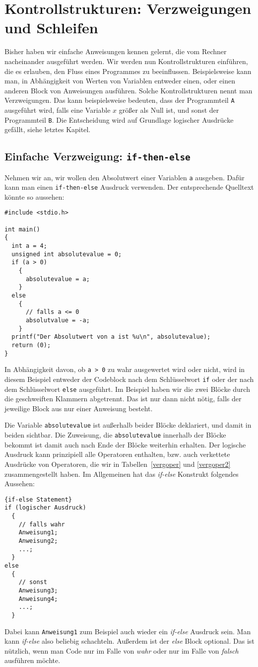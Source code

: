 \section{Kontrollstrukturen: Verzweigungen und Schleifen}

Bisher haben wir einfache Anweisungen kennen gelernt, die vom Rechner nacheinander ausgeführt werden.
Wir werden nun Kontrollstrukturen einführen, die es erlauben, den Fluss eines Programmes zu beeinflussen.
Beispielsweise kann man, in Abhängigkeit von Werten von Variablen entweder einen, oder einen anderen Block von Anweisungen ausführen.
Solche Kontrollstrukturen nennt man Verzweigungen.
Das kann beispielsweise bedeuten, dass der Programmteil \texttt{A} ausgeführt wird, falls eine Variable $x$ größer als Null ist, und sonst der Programmteil \texttt{B}.
Die Entscheidung wird auf Grundlage logischer Ausdrücke gefällt, siehe letztes Kapitel.

\subsection{Einfache Verzweigung: \texttt{if-then-else}}

Nehmen wir an, wir wollen den Absolutwert einer Variablen \verb|a| ausgeben.
Dafür kann man einen \verb|if-then-else| Ausdruck verwenden.
Der entsprechende Quelltext könnte so aussehen:
\begin{lstlisting}
#include <stdio.h>

int main()
{
  int a = 4;
  unsigned int absolutevalue = 0;
  if (a > 0)
    {
      absolutevalue = a;
    }
  else
    {
      // falls a <= 0
      absolutvalue = -a;
    }
  printf("Der Absolutwert von a ist %u\n", absolutevalue);
  return (0);
}
\end{lstlisting}
In Abhängigkeit davon, ob \verb|a > 0| zu wahr ausgewertet wird oder nicht, wird in diesem Beispiel entweder der Codeblock nach dem Schlüsselwort \verb|if| oder der nach dem Schlüsselwort \verb|else| ausgeführt.
Im Beispiel haben wir die zwei Blöcke durch die geschweiften Klammern abgetrennt. 
Das ist nur dann nicht nötig, falls der jeweilige Block aus nur einer Anweisung besteht.

Die Variable \verb|absolutevalue| ist außerhalb beider Blöcke deklariert, und damit in beiden sichtbar.
Die Zuweisung, die \verb|absolutevalue| innerhalb der Blöcke bekommt ist damit auch nach Ende der Blöcke weiterhin erhalten.
Der logische Ausdruck kann prinzipiell alle Operatoren enthalten, bzw. auch verkettete Ausdrücke von Operatoren, die wir in Tabellen~\ref{vergoper} und \ref{vergoper2} zusammengestellt haben.
Im Allgemeinen hat das \emph{if-else} Konstrukt folgendes Aussehen:
\begin{lstlisting}{if-else Statement}
if (logischer Ausdruck)
  {
    // falls wahr
    Anweisung1;
    Anweisung2;
    ...;
  }
else
  {
    // sonst
    Anweisung3;
    Anweisung4;
    ...;
  }
\end{lstlisting}
Dabei kann \verb|Anweisung1| zum Beispiel auch wieder ein \emph{if-else} Ausdruck sein. 
Man kann \emph{if-else} also beliebig schachteln.
Außerdem ist der \emph{else} Block optional.
Das ist nützlich, wenn man Code nur im Falle von \emph{wahr} oder nur im Falle von \emph{falsch} ausführen möchte.

